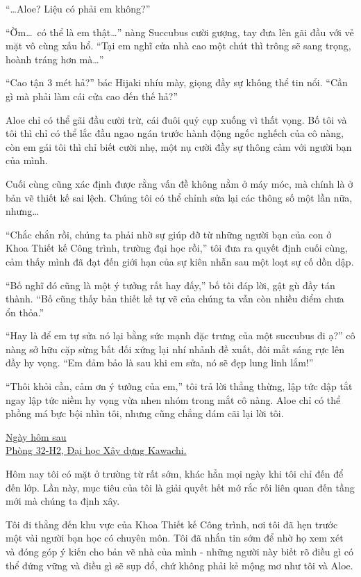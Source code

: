 \documentclass[../main.tex]{subfiles}
\begin{document}
``\dots Aloe? Liệu có phải em không?''

``Ờm\dots\ có thể là em thật\dots'' nàng Succubus cười gượng, tay đưa lên gãi đầu với vẻ mặt vô cùng xấu hổ. ``Tại em nghĩ cửa nhà cao một chút thì trông sẽ sang trọng, hoành tráng hơn mà\dots''

``Cao tận 3 mét hả?'' bác Hijaki nhíu mày, giọng đầy sự không thể tin nổi. ``Cần gì mà phải làm cái cửa cao đến thế hả?''

Aloe chỉ có thể gãi đầu cười trừ, cái đuôi quỷ cụp xuống vì thất vọng. Bố tôi và tôi thì chỉ có thể lắc đầu ngao ngán trước hành động ngốc nghếch của cô nàng, còn em gái tôi thì chỉ biết cười nhẹ, một nụ cười đầy sự thông cảm với người bạn của mình.

Cuối cùng cũng xác định được rằng vấn đề không nằm ở máy móc, mà chính là ở bản vẽ thiết kế sai lệch. Chúng tôi có thể chỉnh sửa lại các thông số một lần nữa, nhưng\dots

``Chắc chắn rồi, chúng ta phải nhờ sự giúp đỡ từ những người bạn của con ở Khoa Thiết kế Công trình, trường đại học rồi,'' tôi đưa ra quyết định cuối cùng, cảm thấy mình đã đạt đến giới hạn của sự kiên nhẫn sau một loạt sự cố dồn dập.

``Bố nghĩ đó cũng là một ý tưởng rất hay đấy,'' bố tôi đáp lời, gật gù đầy tán thành. ``Bố cũng thấy bản thiết kế tự vẽ của chúng ta vẫn còn nhiều điểm chưa ổn thỏa.''

``Hay là để em tự sửa nó lại bằng sức mạnh đặc trưng của một succubus đi ạ?'' cô nàng sở hữu cặp sừng bất đối xứng lại nhí nhảnh đề xuất, đôi mắt sáng rực lên đầy hy vọng. ``Em đảm bảo là sau khi em sửa, nó sẽ đẹp lung linh lắm!''

``Thôi khỏi cần, cảm ơn ý tưởng của em,'' tôi trả lời thẳng thừng, lập tức dập tắt ngay lập tức niềm hy vọng vừa nhen nhóm trong mắt cô nàng. Aloe chỉ có thể phồng má bực bội nhìn tôi, nhưng cũng chẳng dám cãi lại lời tôi.

\ct

\begin{center}
\uline{Ngày hôm sau\\Phòng 32-H2, Đại học Xây dựng Kawachi.}
\end{center}

Hôm nay tôi có mặt ở trường từ rất sớm, khác hẳn mọi ngày khi tôi chỉ đến để đến lớp. Lần này, mục tiêu của tôi là giải quyết hết mớ rắc rối liên quan đến tầng mới mà chúng ta định xây.

Tôi đi thẳng đến khu vực của Khoa Thiết kế Công trình, nơi tôi đã hẹn trước một vài người bạn học có chuyên môn. Tôi đã nhắn tin sớm để nhờ họ xem xét và đóng góp ý kiến cho bản vẽ nhà của mình - những người này biết rõ điều gì có thể đứng vững và điều gì sẽ sụp đổ, chứ không phải kẻ mộng mơ như tôi và Aloe.
\end{document}
